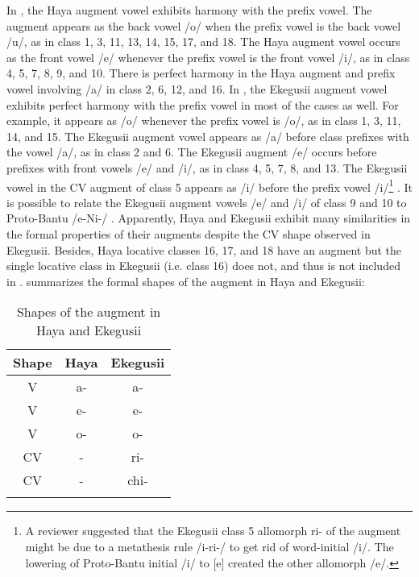 \documentclass[output=paper]{langscibook}
\begin{document}
In , the Haya augment vowel exhibits harmony with the prefix vowel. The augment appears as the back vowel /o/ when the prefix vowel is the back vowel /u/, as in class 1, 3, 11, 13, 14, 15, 17, and 18. The Haya augment vowel occurs as the front vowel /e/ whenever the prefix vowel is the front vowel /i/, as in class 4, 5, 7, 8, 9, and 10. There is perfect harmony in the Haya augment and prefix vowel involving /a/ in class 2, 6, 12, and 16. In , the Ekegusii augment vowel exhibits perfect harmony with the prefix vowel in most of the cases as well. For example, it appears as /o/ whenever the prefix vowel is /o/, as in class 1, 3, 11, 14, and 15. The Ekegusii augment vowel appears as /a/ before class prefixes with the vowel /a/, as in class 2 and 6. The Ekegusii augment /e/ occurs before prefixes with front vowels /e/ and /i/, as in class 4, 5, 7, 8, and 13. The Ekegusii vowel in the CV augment of class 5 appears as /i/ before the prefix vowel /i/\footnote{A reviewer suggested that the Ekegusii class 5 allomorph ri- of the augment might be due to a metathesis rule /i-ri-/ \rightarrow [ri-i-] to get rid of word-initial /i/. The lowering of Proto-Bantu initial /i/ to [e] created the other allomorph /e/.} . It is possible to relate the Ekegusii augment vowels /e/ and /i/ of class 9 and 10 to Proto-Bantu /e-Ni-/ \citep[35]{chagas1977}. Apparently, Haya and Ekegusii exhibit many similarities in the formal properties of their augments despite the CV shape observed in Ekegusii. Besides, Haya locative classes 16, 17, and 18 have an augment but the single locative class in Ekegusii (i.e. class 16) does not, and thus is not included in .  summarizes the formal shapes of the augment in Haya and Ekegusii:

\begin{table}
    \begin{tabular}{ccc}
    \lsptoprule
      Shape   &  Haya & Ekegusii\\\midrule
        V & a- & a- \\
        V & e- & e- \\
        V & o- & o- \\
    CV & - & ri- \\
    CV & - & chi- \\
    \lspbottomrule
    \end{tabular}
    \caption{Shapes of the augment in Haya and Ekegusii}
    \label{tab:1l}
\end{table}
\end{document}

